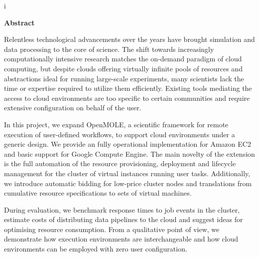 i\thispagestyle{empty}

\begin{center}
\vspace*{4cm}
\textbf{Abstract}
\end{center}

\vspace*{0.3cm}
\begin{spacing}{1.0}
Relentless technological advancements over the years have brought simulation and data processing to the core of science. The shift towards increasingly computationally intensive research matches the on-demand paradigm of cloud computing, but despite clouds offering virtually infinite pools of resources and abstractions ideal for running large-scale experiments, many scientists lack the time or expertise required to utilize them efficiently. Existing tools mediating the access to cloud environments are too specific to certain communities and require extensive configuration on behalf of the user. 

In this project, we expand OpenMOLE, a scientific framework for remote execution of user-defined workflows, to support cloud environments under a generic design. We provide an fully operational implementation for Amazon EC2 and basic support for Google Compute Engine. The main novelty of the extension is the full automation of the resource provisioning, deployment and lifecycle management for the cluster of virtual instances running user tasks. Additionally, we introduce automatic bidding for low-price cluster nodes and translations from cumulative resource specifications to sets of virtual machines.

During evaluation, we benchmark response times to job events in the cluster, estimate costs of distributing data pipelines to the cloud and suggest ideas for optimising resource consumption. From a qualitative point of view, we demonstrate how execution environments are interchangeable and how cloud environments can be employed with zero user configuration.
\end{spacing}

\newpage
\blankpage










